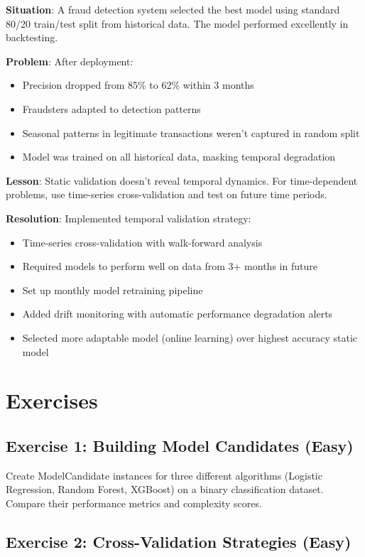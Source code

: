 \textbf{Situation}: A fraud detection system selected the best model using standard 80/20 train/test split from historical data. The model performed excellently in backtesting.

\textbf{Problem}: After deployment:
\begin{itemize}
    \item Precision dropped from 85\% to 62\% within 3 months
    \item Fraudsters adapted to detection patterns
    \item Seasonal patterns in legitimate transactions weren't captured in random split
    \item Model was trained on all historical data, masking temporal degradation
\end{itemize}

\textbf{Lesson}: Static validation doesn't reveal temporal dynamics. For time-dependent problems, use time-series cross-validation and test on future time periods.

\textbf{Resolution}: Implemented temporal validation strategy:
\begin{itemize}
    \item Time-series cross-validation with walk-forward analysis
    \item Required models to perform well on data from 3+ months in future
    \item Set up monthly model retraining pipeline
    \item Added drift monitoring with automatic performance degradation alerts
    \item Selected more adaptable model (online learning) over highest accuracy static model
\end{itemize}

\section{Exercises}

\subsection{Exercise 1: Building Model Candidates (Easy)}

Create ModelCandidate instances for three different algorithms (Logistic Regression, Random Forest, XGBoost) on a binary classification dataset. Compare their performance metrics and complexity scores.

\subsection{Exercise 2: Cross-Validation Strategies (Easy)}

